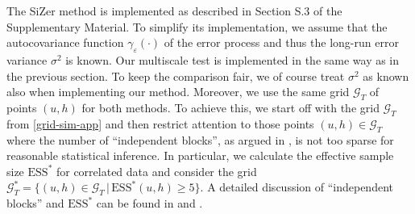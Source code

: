 The SiZer method is implemented as described in Section S.3 of the Supplementary Material. To simplify its implementation, we assume that the autocovariance function $\gamma_\varepsilon(\cdot)$ of the error process and thus the long-run error variance $\sigma^2$ is known. Our multiscale test is implemented in the same way as in the previous section. To keep the comparison fair, we of course treat $\sigma^2$ as known also when implementing our method. Moreover, we use the same grid $\mathcal{G}_T$ of points $(u,h)$ for both methods. To achieve this, we start off with the grid $\mathcal{G}_T$ from \eqref{grid-sim-app} and then restrict attention to those points $(u,h) \in \mathcal{G}_T$ where the number of ``independent blocks'', as argued in \cite{Rondonotti2007}, is not too sparse for reasonable statistical inference. In particular, we calculate the effective sample size $\text{ESS}^*$ for correlated data and consider the grid $\mathcal{G}_T^* = \{ (u, h) \in \mathcal{G}_T \, | \, \text{ESS}^*(u, h) \geq 5 \}$. A detailed discussion of ``independent blocks'' and $\text{ESS}^*$ can be found in \cite{ChaudhuriMarron1999} and \cite{Rondonotti2007}. 


